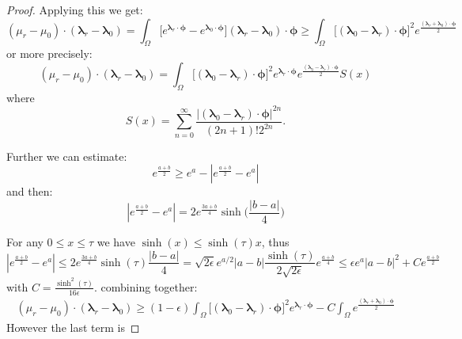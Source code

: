 \documentclass{article}
\def\vc#1{\mathbf{\boldsymbol{#1}}}     %
\def\tn#1{\boldsymbol{#1}}
\def\abs#1{|#1|}
\def\vl{{\vc\lambda}}
\def\vmu{\vc\mu}
\def\estvmu{{\vc{\hat\mu}}}
\def\vphi{\vc\phi}
\begin{document}
\begin{proof}
% 


Applying this we get:
\[
  (\mu_r - \mu_0) \cdot (\vl_r - \vl_0) =
  \int_\Omega \Big[ e^{\vl_r\cdot\vphi} - e^{\vl_0\cdot\vphi} \Big] (\vl_r - \vl_0) \cdot \vphi 
  \ge \int_\Omega  \big[ (\vl_0 - \vl_r) \cdot \vphi \big]^2 e^\frac{(\vl_r + \vl_0) \cdot \vphi}{2}
\]
or more precisely:
\[
  (\mu_r - \mu_0) \cdot (\vl_r - \vl_0) =
  \int_\Omega  \big[ (\vl_0 - \vl_r) \cdot \vphi \big]^2 e^{\vl_r\cdot\vphi} e^\frac{(\vl_0 - \vl_r) \cdot \vphi}{2} S(x)
\]
where
\[
  S(x) = \sum_{n=0}^\infty \frac{|(\vl_0 - \vl_r) \cdot \vphi|^{2n}}{(2n+1)!2^{2n}}.
\]





Further we can estimate:
\[
    e^\frac{a + b}{2} \ge e^{a} - \abs{e^\frac{a + b}{2} - e^{a}}
\]
and then:
\[
 \abs{e^\frac{a + b}{2} - e^{a}} = 2e^\frac{3a+b}{4} \sinh\Big(\frac{|b-a|}{4}\Big)
\]

For any $0 \le x \le \tau$ we have $\sinh(x) \le \sinh(\tau) x$, thus
\[
 \abs{e^\frac{a + b}{2} - e^{a}} \le 2e^\frac{3a+b}{4} \sinh(\tau) \frac{|b-a|}{4}
 =  \sqrt{2\epsilon} e^{a/2}|a-b| \frac{\sinh(\tau)}{2\sqrt{2\epsilon}} e^{\frac{a+b}{4}}  \le 
    \epsilon e^{a}|a-b|^2 +  C e^{\frac{a+b}{2}}
\]
with $C = \frac{\sinh^2(\tau)}{16\epsilon}$.
combining together:
\begin{align*}
 (\mu_r - \mu_0) \cdot (\vl_r - \vl_0) 
 \ge (1-\epsilon)\int_\Omega  \big[ (\vl_0 - \vl_r) \cdot \vphi \big]^2 e^{\vl_r \cdot \vphi}
 -C \int_\Omega e^\frac{(\vl_r + \vl_0) \cdot \vphi}{2}
\end{align*}
However the last term is 












\end{proof}
\end{document}
